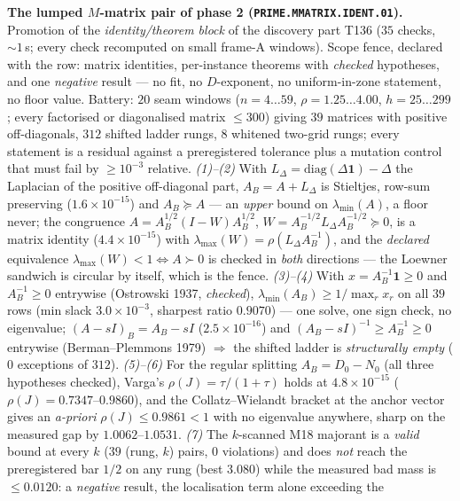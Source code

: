 \documentclass[11pt,a4paper]{article}
\begin{document}
\par\smallskip\noindent\textbf{The lumped $M$-matrix pair of phase 2
(\texttt{PRIME.MMATRIX.IDENT.01}).}
Promotion of the \emph{identity/theorem block} of the discovery part T136
($35$ checks, ${\sim}1$\,s; every check recomputed on small frame-A windows).
Scope fence, declared with the row: matrix identities, per-instance theorems with
\emph{checked} hypotheses, and one \emph{negative} result --- no fit, no
$D$-exponent, no uniform-in-zone statement, no floor value. Battery: $20$ seam
windows ($n=4\ldots59$, $\rho=1.25\ldots4.00$, $h=25\ldots299$; every factorised
or diagonalised matrix $\le300$) giving $39$ matrices with positive
off-diagonals, $312$ shifted ladder rungs, $8$ whitened two-grid rungs; every
statement is a residual against a preregistered tolerance plus a mutation control
that must fail by $\ge10^{-3}$ relative.
\emph{(1)--(2)} With $L_\Delta=\mathrm{diag}(\Delta\mathbf 1)-\Delta$ the
Laplacian of the positive off-diagonal part, $A_B=A+L_\Delta$ is Stieltjes,
row-sum preserving ($1.6\times10^{-15}$) and $A_B\succeq A$ --- an \emph{upper}
bound on $\lambda_{\min}(A)$, a floor never; the congruence
$A=A_B^{1/2}(I-W)A_B^{1/2}$, $W=A_B^{-1/2}L_\Delta A_B^{-1/2}\succeq0$, is a
matrix identity ($4.4\times10^{-15}$) with
$\lambda_{\max}(W)=\rho(L_\Delta A_B^{-1})$, and the \emph{declared}
equivalence $\lambda_{\max}(W)<1\iff A\succ0$ is checked in \emph{both}
directions --- the Loewner sandwich is circular by itself, which is the fence.
\emph{(3)--(4)} With $x=A_B^{-1}\mathbf 1\ge0$ and $A_B^{-1}\ge0$ entrywise
(Ostrowski 1937, \emph{checked}), $\lambda_{\min}(A_B)\ge1/\max_r x_r$ on all
$39$ rows (min slack $3.0\times10^{-3}$, sharpest ratio $0.9070$) --- one solve,
one sign check, no eigenvalue; $(A-sI)_B=A_B-sI$ ($2.5\times10^{-16}$) and
$(A_B-sI)^{-1}\ge A_B^{-1}\ge0$ entrywise (Berman--Plemmons 1979) $\Rightarrow$
the shifted ladder is \emph{structurally empty} ($0$ exceptions of $312$).
\emph{(5)--(6)} For the regular splitting $A_B=D_0-N_0$ (all three hypotheses
checked), Varga's $\rho(J)=\tau/(1+\tau)$ holds at $4.8\times10^{-15}$
($\rho(J)=0.7347$--$0.9860$), and the Collatz--Wielandt bracket at the anchor
vector gives an \emph{a-priori} $\rho(J)\le0.9861<1$ with no eigenvalue
anywhere, sharp on the measured gap by $1.0062$--$1.0531$.
\emph{(7)} The $k$-scanned M18 majorant is a \emph{valid} bound at every $k$
($39$ (rung, $k$) pairs, $0$ violations) and does \emph{not} reach the
preregistered bar $1/2$ on any rung (best $3.080$) while the measured bad mass is
$\le0.0120$: a \emph{negative} result, the localisation term alone exceeding the
\end{document}
